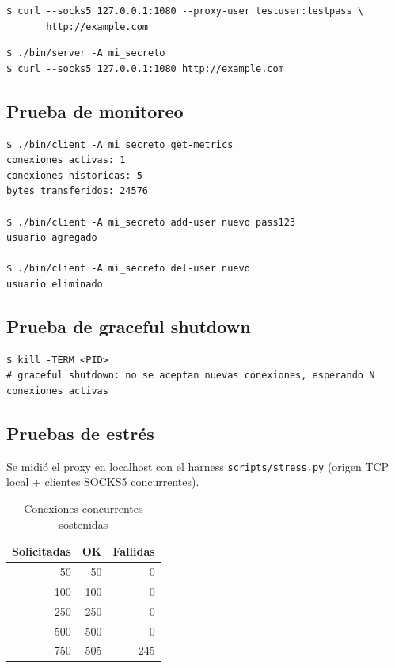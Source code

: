 \documentclass[12pt,a4paper]{article}
\begin{document}
\begin{lstlisting}[caption=Proxy con autenticación]
$ curl --socks5 127.0.0.1:1080 --proxy-user testuser:testpass \
       http://example.com
\end{lstlisting}

\begin{lstlisting}[caption=Proxy sin usuarios (NO AUTH)]
$ ./bin/server -A mi_secreto
$ curl --socks5 127.0.0.1:1080 http://example.com
\end{lstlisting}

\subsection{Prueba de monitoreo}

\begin{lstlisting}[caption=Métricas y usuarios en caliente]
$ ./bin/client -A mi_secreto get-metrics
conexiones activas: 1
conexiones historicas: 5
bytes transferidos: 24576

$ ./bin/client -A mi_secreto add-user nuevo pass123
usuario agregado

$ ./bin/client -A mi_secreto del-user nuevo
usuario eliminado
\end{lstlisting}

\subsection{Prueba de graceful shutdown}

\begin{lstlisting}[caption=SIGTERM]
$ kill -TERM <PID>
# graceful shutdown: no se aceptan nuevas conexiones, esperando N conexiones activas
\end{lstlisting}

\subsection{Pruebas de estrés}

Se midió el proxy en localhost con el harness \texttt{scripts/stress.py}
(origen TCP local + clientes SOCKS5 concurrentes).

\begin{table}[H]
\centering
\caption{Conexiones concurrentes sostenidas}
\begin{tabular}{rrr}
\toprule
Solicitadas & OK & Fallidas \\
\midrule
50 & 50 & 0 \\
100 & 100 & 0 \\
250 & 250 & 0 \\
500 & 500 & 0 \\
750 & 505 & 245 \\
\bottomrule
\end{tabular}
\end{table}
\end{document}
